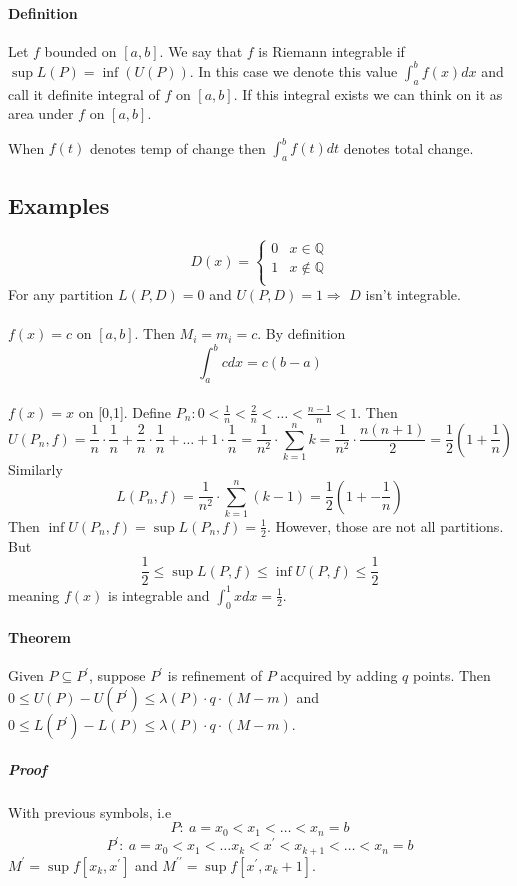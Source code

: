 \paragraph{Definition} Let $f$ bounded on $[a,b]$. We say that $f$ is Riemann integrable if $\sup L(P) = \inf (U(P))$. In this case we denote this value $\int_a^b f(x) dx$ and call it definite integral of $f$ on $[a,b]$. If this integral exists we can think on it as area under $f$ on $[a,b]$.

When $f(t)$ denotes temp of change then $\int_a^b f(t) dt$ denotes total change.
\subsection{Examples}
\paragraph{} 
$$
D(x) = \begin{cases}
0&x\in\mathbb{Q}\\
1&x\notin\mathbb{Q}\\
\end{cases}
$$
For any partition $L(P,D) = 0$ and $U(P,D) = 1 \Rightarrow$ $D$ isn't integrable.
\paragraph{} $f(x) = c$ on $[a,b]$. Then $M_i = m_i = c$. By definition $$\int_a^b c dx= c(b-a)$$ 
\paragraph{} $f(x) =x$ on [0,1]. Define $P_n: 0 < \frac{1}{n}  < \frac{2}{n} < \dots < \frac{n-1}{n} < 1$. Then
$$U(P_n,f) = \frac{1}{n} \cdot \frac{1}{n} +  \frac{2}{n} \cdot \frac{1}{n} + \dots +  1 \cdot \frac{1}{n} = \frac{1}{n^2} \cdot \sum_{k=1}^{n} k = \frac{1}{n^2} \cdot \frac{n(n+1)}{2}  = \frac{1}{2} \left( 1+ \frac{1}{n} \right)$$ 
Similarly
$$L(P_n,f) = \frac{1}{n^2} \cdot \sum_{k=1}^{n} \left(k-1\right) = \frac{1}{2} \left( 1+- \frac{1}{n} \right)$$ 
Then $\inf U(P_n, f) = \sup L(P_n,f) = \frac{1}{2}$. However, those are not all partitions. But
$$\frac{1}{2} \leq \sup L(P,f) \leq \inf U(P,f) \leq \frac{1}{2}$$
meaning $f(x)$ is integrable and $\int_0^1 x dx =\frac{1}{2}$.
\paragraph{Theorem} Given $P\subseteq P^\prime$, suppose $P^\prime$ is refinement of $P$ acquired by adding $q$ points. Then $0 \leq U(P) - U(P^\prime) \leq \lambda(P)\cdot q \cdot (M-m)$ and $0 \leq L(P^\prime) - L(P) \leq \lambda(P)\cdot q \cdot (M-m)$.
\subparagraph{Proof} With previous symbols, i.e 
$$P:\: a=x_0<x_1<\dots<x_n=b$$
$$P^\prime:\: a=x_0<x_1<\dots x_k<x^\prime < x_{k+1}< \dots<x_n=b$$
$M^\prime = \sup f [x_k, x^\prime]$ and $M^{\prime \prime} = \sup f [x^\prime, x_k+1]$.


